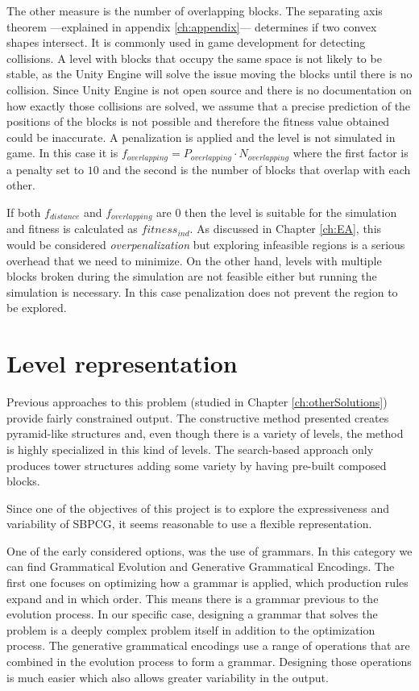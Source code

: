 The other measure is the number of overlapping blocks. The separating axis theorem ---explained in appendix \ref{ch:appendix}--- determines if two convex shapes intersect. It is commonly used in game development for detecting collisions. A level with blocks that occupy the same space is not likely to be stable, as the Unity Engine will solve the issue moving the blocks until there is no collision. Since Unity Engine is not open source and there is no documentation on how exactly those collisions are solved, we assume that a precise prediction of the positions of the blocks is not possible and therefore the fitness value obtained could be inaccurate. A penalization is applied and the level is not simulated in game. In this case it is $f_{overlapping} = P_{overlapping} \cdot N_{overlapping}$ where the first factor is a penalty set to $10$ and the second is the number of  blocks that overlap with each other. 

If both $f_{distance}$ and $f_{overlapping}$ are $0$ then the level is suitable for the simulation and fitness is calculated as $fitness_{ind}$. As discussed in Chapter \ref{ch:EA}, this would be considered \textit{overpenalization} but exploring infeasible regions is a serious overhead that we need to minimize. On the other hand, levels with multiple blocks broken during the simulation are not feasible either but running the simulation is necessary. In this case penalization does not prevent the region to be explored.
\section{Level representation}

Previous approaches to this problem (studied in Chapter \ref{ch:otherSolutions}) provide fairly constrained output. The constructive method presented creates pyramid-like structures and, even though there is a variety of levels, the method is highly specialized in this kind of levels. The search-based approach only produces tower structures adding some variety by having pre-built composed blocks. 

Since one of the objectives of this project is to explore the expressiveness and variability of \acs{SBPCG}, it seems reasonable to use a flexible representation. 

One of the early considered options, was the use of grammars. In this category we can find Grammatical Evolution\cite{lourencco2015sge} and Generative Grammatical Encodings\cite{hornby2001advantages}. The first one focuses on optimizing how a grammar is applied, which production rules expand and in which order. This means there is a grammar previous to the evolution process. In our specific case, designing a grammar that solves the problem is a deeply complex problem itself in addition to the optimization process. The generative grammatical encodings use a range of operations that are combined in the evolution process to form a grammar. Designing those operations is much easier which also allows greater variability in the output. 

